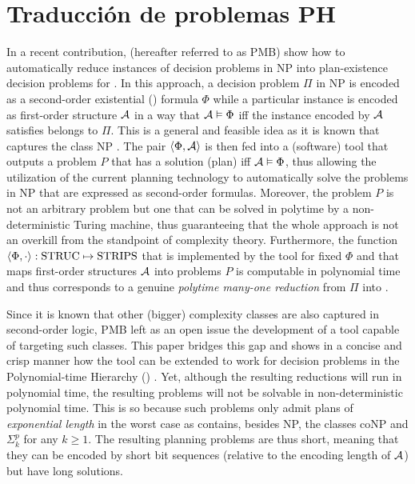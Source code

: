 
\chapter{Traducción de problemas PH}
\label{Chapter3}

In a recent contribution,
(hereafter referred to as PMB) show how to automatically reduce
instances of decision problems in NP into plan-existence decision
problems for \STRIPS.
In this approach, a decision problem $\Pi$ in NP is encoded as a
second-order existential (\SOE) formula $\Phi$ while a particular
instance is encoded as first-order structure $\mathcal{A}$ in a way that
$\mathcal{A}\vDash\Phi$ iff the instance encoded by $\mathcal{A}$ satisfies belongs to $\Pi$.
This is a general and feasible idea as it is known that \SOE
captures the class NP \cite{immerman:book}.
The pair $\langle \Phi,\mathcal{A} \rangle$ is then fed into a (software) tool that
outputs a \STRIPS problem $P$ that has a solution (plan) iff $\mathcal{A}\vDash\Phi$,
thus allowing the utilization of the current planning technology
to automatically solve the problems in NP that are expressed as
second-order formulas.
Moreover, the problem $P$ is not an arbitrary \STRIPS problem but
one that can be solved in polytime by a non-deterministic
Turing machine, thus guaranteeing that the whole approach is not
an overkill from the standpoint of complexity theory.
Furthermore, the function $\langle \Phi,\cdot \rangle:\text{STRUC}\mapsto\text{STRIPS}$ 
that is implemented by the tool for fixed $\Phi$ and that maps
first-order structures $\mathcal{A}$ into \STRIPS problems $P$ is computable
in polynomial time and thus corresponds to a genuine \emph{polytime many-one reduction}
from $\Pi$ into \STRIPS.

Since it is known that other (bigger) complexity classes are also
captured in second-order logic, PMB left as an open issue the
development of a tool capable of targeting such classes.
This paper bridges this gap and shows in a concise and crisp manner
how the tool can be extended to work for decision problems in the
Polynomial-time Hierarchy (\PH) \cite{sipser:book}.
Yet, although the resulting reductions will run in polynomial
time, the resulting \STRIPS problems will not be solvable in
non-deterministic polynomial time.
This is so because such problems only admit plans of
\emph{exponential length} in the worst case as \PH contains, besides
NP, the classes coNP and $\Sigma^p_k$ for any $k\geq 1$.
The resulting planning problems are thus short, meaning that they can
be encoded by short bit sequences (relative to the encoding length of
$\mathcal{A}$) but have long solutions.

